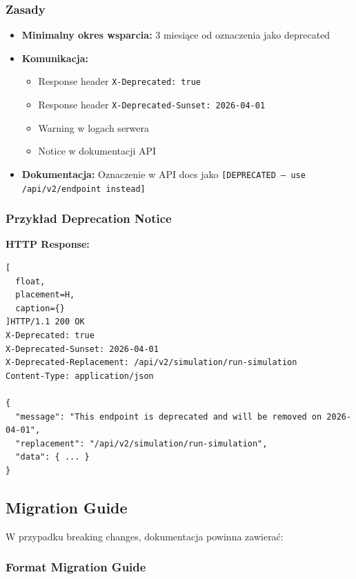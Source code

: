 \subsubsection{Zasady}

\begin{itemize}
    \item \textbf{Minimalny okres wsparcia:} 3 miesiące od oznaczenia jako deprecated
    \item \textbf{Komunikacja:}
    \begin{itemize}
        \item Response header \texttt{X-Deprecated: true}
        \item Response header \texttt{X-Deprecated-Sunset: 2026-04-01}
        \item Warning w logach serwera
        \item Notice w dokumentacji API
    \end{itemize}
    \item \textbf{Dokumentacja:} Oznaczenie w API docs jako \texttt{[DEPRECATED -- use /api/v2/endpoint instead]}
\end{itemize}

\subsubsection{Przykład Deprecation Notice}

\textbf{HTTP Response:}
\begin{lstlisting}[
  float,
  placement=H,
  caption={}
]HTTP/1.1 200 OK
X-Deprecated: true
X-Deprecated-Sunset: 2026-04-01
X-Deprecated-Replacement: /api/v2/simulation/run-simulation
Content-Type: application/json

{
  "message": "This endpoint is deprecated and will be removed on 2026-04-01",
  "replacement": "/api/v2/simulation/run-simulation",
  "data": { ... }
}
\end{lstlisting}

\subsection{Migration Guide}

W przypadku breaking changes, dokumentacja powinna zawierać:

\subsubsection{Format Migration Guide}


